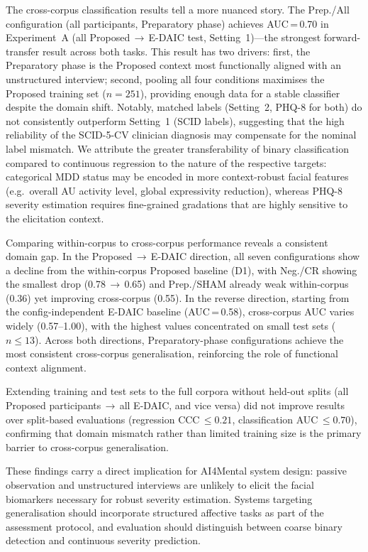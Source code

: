 \documentclass[sigconf]{acmart}
\begin{document}
The cross-corpus classification results tell a more nuanced story.
The Prep./All configuration (all participants, Preparatory phase) achieves AUC\,=\,0.70
in Experiment~A (all Proposed\,$\to$\,E-DAIC test, Setting~1)---the strongest forward-transfer
result across both tasks. This result has two drivers: first, the Preparatory phase is the
Proposed context most functionally aligned with an unstructured interview; second,
pooling all four conditions maximises the Proposed training set ($n=251$), providing
enough data for a stable classifier despite the domain shift.
Notably, matched labels (Setting~2, PHQ-8 for both) do not consistently outperform
Setting~1 (SCID labels), suggesting that the high reliability of the SCID-5-CV
clinician diagnosis may compensate for the nominal label mismatch.
We attribute the greater transferability of binary classification compared to
continuous regression to the nature of the respective targets: categorical MDD status
may be encoded in more context-robust facial features (e.g.\ overall AU activity level,
global expressivity reduction), whereas PHQ-8 severity estimation requires fine-grained
gradations that are highly sensitive to the elicitation context.

Comparing within-corpus to cross-corpus performance reveals a consistent domain gap.
In the Proposed$\,\to\,$E-DAIC direction, all seven configurations show a decline from
the within-corpus Proposed baseline (D1), with Neg./CR showing the smallest drop
(0.78\,$\to$\,0.65) and Prep./SHAM already weak within-corpus (0.36) yet improving
cross-corpus (0.55).
In the reverse direction, starting from the config-independent E-DAIC baseline
(AUC\,=\,0.58), cross-corpus AUC varies widely (0.57--1.00), with the highest values
concentrated on small test sets ($n \le 13$).
Across both directions, Preparatory-phase configurations achieve the most consistent
cross-corpus generalisation, reinforcing the role of functional context alignment.

Extending training and test sets to the full corpora without held-out splits (all
Proposed participants\,$\to$\,all E-DAIC, and vice versa) did not improve results
over split-based evaluations (regression CCC\,$\leq 0.21$, classification
AUC\,$\leq 0.70$), confirming that domain mismatch rather than limited training size
is the primary barrier to cross-corpus generalisation.

These findings carry a direct implication for AI4Mental system design: passive observation
and unstructured interviews are unlikely to elicit the facial biomarkers necessary for
robust severity estimation. Systems targeting generalisation should incorporate structured
affective tasks as part of the assessment protocol, and evaluation should distinguish
between coarse binary detection and continuous severity prediction.
\end{document}
